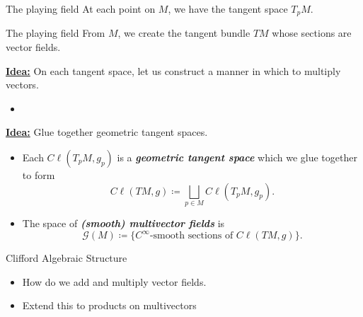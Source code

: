 \documentclass[aspectratio=169,handout]{beamer}
\newcommand\boldgreen[1]{\textcolor{lighter_csu_green}{\emph{\textbf{#1}}}}
\newcommand{\G}{\mathcal{G}}
\begin{document}
\begin{frame}{The playing field}
\vfill
At each point on $M$, we have the tangent space $T_pM$.
\begin{figure}[H]
	\centering
	\def\svgwidth{.6\columnwidth}
	
\end{figure}
\vfill    
\end{frame}

\begin{frame}{The playing field}
\vfill
From $M$, we create the tangent bundle $TM$ whose sections are vector fields.
\begin{figure}[H]
	\centering
	\def\svgwidth{.6\columnwidth}
	
\end{figure}
\vfill
\end{frame}

\begin{frame}{}
\vfill
    \textbf{\underline{Idea:}} On each tangent space, let us construct a manner in which to multiply vectors.
    \pause
    \begin{itemize}
        \item 
    \end{itemize}
\vfill
\end{frame}

\begin{frame}{}
\vfill
    \textbf{\underline{Idea:}} Glue together geometric tangent spaces.
    \pause
    \begin{itemize}
        \item Each $C\ell(T_pM,g_p)$ is a \boldgreen{geometric tangent space} which we glue together to form
        \[
        C\ell(TM,g) \coloneqq \bigsqcup_{p\in M} C\ell(T_pM,g_p).
        \]
    
        \item The space of \boldgreen{(smooth) multivector fields} is
        \[
        \G(M) \coloneqq \{\textrm{$C^\infty$-smooth sections of $C\ell(TM,g)$}\}.
        \]
    \end{itemize}
\vfill
\end{frame}

\begin{frame}{Clifford Algebraic Structure}
\vfill
    \pause
    \begin{itemize}
        \item How do we add and multiply vector fields.
    
        \item Extend this to products on multivectors
    \end{itemize}
\vfill
\end{frame}
\end{document}
